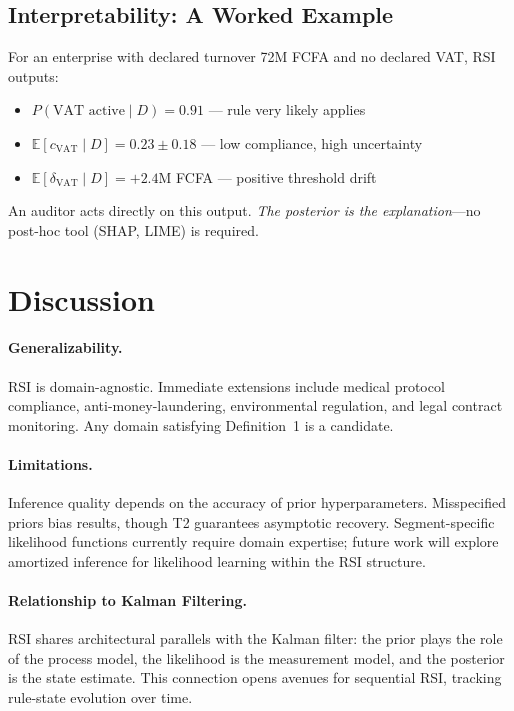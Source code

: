 \documentclass[letterpaper]{article}
\begin{document}
\subsection{Interpretability: A Worked Example}

For an enterprise with declared turnover 72M FCFA and no declared VAT,
RSI outputs:
\begin{itemize}[leftmargin=2em]
  \item $P(\text{VAT active} \mid D) = 0.91$ --- rule very likely applies
  \item $\mathbb{E}[c_{\mathrm{VAT}} \mid D] = 0.23 \pm 0.18$ --- low compliance, high uncertainty
  \item $\mathbb{E}[\delta_{\mathrm{VAT}} \mid D] = +2.4$M FCFA --- positive threshold drift
\end{itemize}
An auditor acts directly on this output.
\emph{The posterior is the explanation}---no post-hoc tool (SHAP,
LIME) is required.

\section{Discussion}
\label{sec:discussion}

\paragraph{Generalizability.}
RSI is domain-agnostic. Immediate extensions include medical protocol
compliance, anti-money-laundering, environmental regulation, and
legal contract monitoring. Any domain satisfying Definition~1 is
a candidate.

\paragraph{Limitations.}
Inference quality depends on the accuracy of prior hyperparameters.
Misspecified priors bias results, though T2 guarantees asymptotic
recovery. Segment-specific likelihood functions currently require
domain expertise; future work will explore amortized inference for
likelihood learning within the RSI structure.

\paragraph{Relationship to Kalman Filtering.}
RSI shares architectural parallels with the Kalman filter: the prior
plays the role of the process model, the likelihood is the measurement
model, and the posterior is the state estimate. This connection opens
avenues for sequential RSI, tracking rule-state evolution over time.
\end{document}
